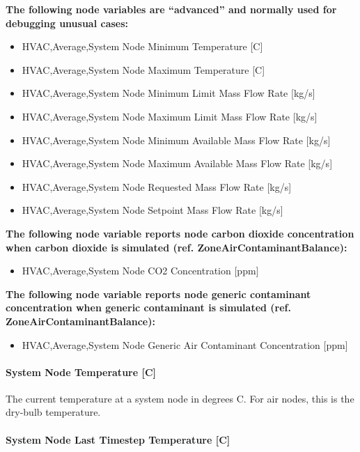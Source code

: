 \textbf{The following node variables are ``advanced'' and normally used for debugging unusual cases:}

\begin{itemize}
\item
  HVAC,Average,System Node Minimum Temperature {[}C{]}
\item
  HVAC,Average,System Node Maximum Temperature {[}C{]}
\item
  HVAC,Average,System Node Minimum Limit Mass Flow Rate {[}kg/s{]}
\item
  HVAC,Average,System Node Maximum Limit Mass Flow Rate {[}kg/s{]}
\item
  HVAC,Average,System Node Minimum Available Mass Flow Rate {[}kg/s{]}
\item
  HVAC,Average,System Node Maximum Available Mass Flow Rate {[}kg/s{]}
\item
  HVAC,Average,System Node Requested Mass Flow Rate {[}kg/s{]}
\item
  HVAC,Average,System Node Setpoint Mass Flow Rate {[}kg/s{]}
\end{itemize}

\textbf{The following node variable reports node carbon dioxide concentration when carbon dioxide is simulated (ref. ZoneAirContaminantBalance):}

\begin{itemize}
\tightlist
\item
  HVAC,Average,System Node CO2 Concentration {[}ppm{]}
\end{itemize}

\textbf{The following node variable reports node generic contaminant concentration when generic contaminant is simulated (ref. ZoneAirContaminantBalance):}

\begin{itemize}
\tightlist
\item
  HVAC,Average,System Node Generic Air Contaminant Concentration {[}ppm{]}
\end{itemize}

\paragraph{System Node Temperature {[}C{]}}\label{system-node-temperature-c-000}

The current temperature at a system node in degrees C. For air nodes, this is the dry-bulb temperature.

\paragraph{System Node Last Timestep Temperature {[}C{]}}\label{system-node-last-timestep-temperature-c}

